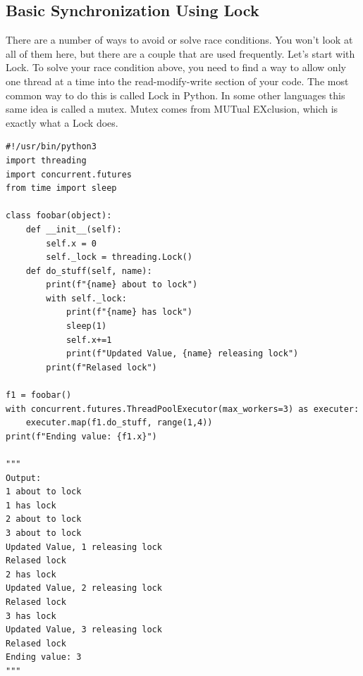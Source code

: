 \documentclass{report}
\begin{document}
    \subsection{Basic Synchronization Using Lock}
    \bigbreak \noindent 
    There are a number of ways to avoid or solve race conditions. You won’t look at all of them here, but there are a couple that are used frequently. Let’s start with Lock.
    \bigbreak \noindent 
    To solve your race condition above, you need to find a way to allow only one thread at a time into the read-modify-write section of your code. The most common way to do this is called Lock in Python. In some other languages this same idea is called a mutex. Mutex comes from MUTual EXclusion, which is exactly what a Lock does.
    \begin{mdframed}
        \begin{verbatim}
#!/usr/bin/python3
import threading
import concurrent.futures
from time import sleep

class foobar(object):
    def __init__(self):
        self.x = 0
        self._lock = threading.Lock()
    def do_stuff(self, name):
        print(f"{name} about to lock")
        with self._lock:
            print(f"{name} has lock")
            sleep(1)
            self.x+=1
            print(f"Updated Value, {name} releasing lock")
        print(f"Relased lock")

f1 = foobar()
with concurrent.futures.ThreadPoolExecutor(max_workers=3) as executer:
    executer.map(f1.do_stuff, range(1,4))
print(f"Ending value: {f1.x}")

"""
Output:
1 about to lock
1 has lock
2 about to lock
3 about to lock
Updated Value, 1 releasing lock
Relased lock
2 has lock
Updated Value, 2 releasing lock
Relased lock
3 has lock
Updated Value, 3 releasing lock
Relased lock
Ending value: 3
"""
        \end{verbatim}
    \end{mdframed}

    \pagebreak \bigbreak \noindent 
\end{document}

